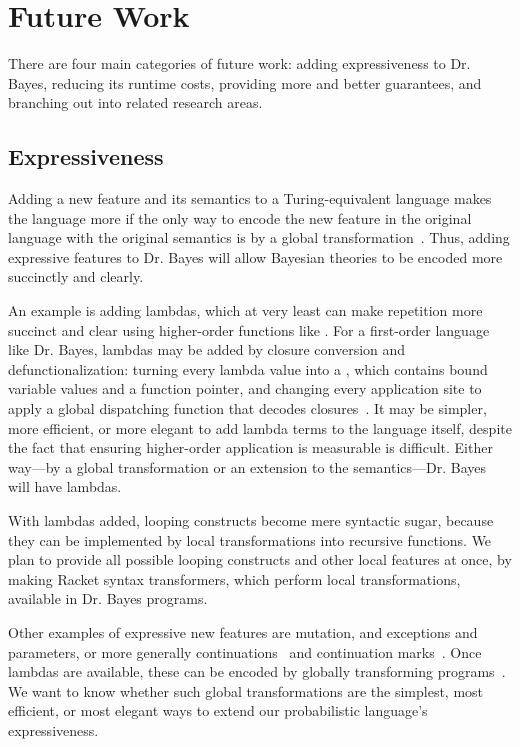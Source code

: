 \section{Future Work}

There are four main categories of future work: adding expressiveness to Dr. Bayes, reducing its runtime costs, providing more and better guarantees, and branching out into related research areas.

\subsection{Expressiveness}

Adding a new feature and its semantics to a Turing-equivalent language makes the language more  if the only way to encode the new feature in the original language with the original semantics is by a global transformation~\cite{cit:felleisen-1990scp-expressive}.
Thus, adding expressive features to Dr. Bayes will allow Bayesian theories to be encoded more succinctly and clearly.

An example is adding lambdas, which at very least can make repetition more succinct and clear using higher-order functions like .
For a first-order language like Dr. Bayes, lambdas may be added by closure conversion and defunctionalization: turning every lambda value into a , which contains bound variable values and a function pointer, and changing every application site to apply a global dispatching function that decodes closures~\cite{cit:danvy-2001-defunctionalization}.
It may be simpler, more efficient, or more elegant to add lambda terms to the language itself, despite the fact that ensuring higher-order application is measurable is difficult.
Either way---by a global transformation or an extension to the semantics---Dr. Bayes will have lambdas.

With lambdas added, looping constructs become mere syntactic sugar, because they can be implemented by local transformations into recursive functions.
We plan to provide all possible looping constructs and other local features at once, by making Racket syntax transformers, which perform local transformations, available in Dr. Bayes programs.

Other examples of expressive new features are mutation, and exceptions and parameters, or more generally continuations~\cite{cit:staram-1990-control} and continuation marks~\cite{cit:clements-2006diss}.
Once lambdas are available, these can be encoded by globally transforming programs~\cite{cit:danvy-2007-one-pass-cps,cit:germane-ms-thesis}.
We want to know whether such global transformations are the simplest, most efficient, or most elegant ways to extend our probabilistic language's expressiveness.

